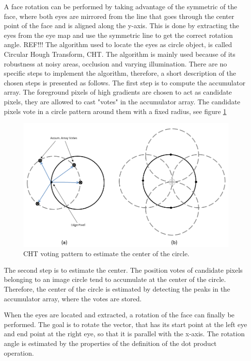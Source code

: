 A face rotation can be performed by taking advantage of the symmetric of the face, where both eyes are mirrored from the line that goes through the center point of the face and is aligned along the y-axis. This is done by extracting the eyes from the eye map and use the symmetric line to get the correct rotation angle.
\newline
REF!!!
The algorithm used to locate the eyes as circle object, is called Circular Hough Transform, CHT. The algorithm is mainly used because of its robustness at noisy areas, occlusion and varying illumination. There are no specific steps to implement the algorithm, therefore, a short description of the chosen steps is presented as follows.
\newline
\newline
The first step is to compute the accumulator array. The foreground pixels of high gradients are chosen to act as candidate pixels, they are allowed to cast "votes" in the accumulator array. The candidate pixels vote in a circle pattern around them with a fixed radius, see figure \ref{fig:CHT}
\newline
\begin{figure}[H]
\centering

\includegraphics[scale=0.4]{img/fd/accarray.png}

\caption{CHT voting pattern to estimate the center of the circle.}
\label{fig:CHT}
\end{figure}
\indent 
The second step is to estimate the center. The position votes of candidate pixels belonging to an image circle tend to accumulate at the center of the circle. Therefore, the center of the circle is estimated by detecting the peaks in the accumulator array, where the votes are stored.

When the eyes are located and extracted, a rotation of the face can finally be performed.  The goal is to rotate the vector, that has its start point at the left eye and end point at the right eye, so that it is parallel with the x-axis. The rotation angle is estimated by the properties of the definition of the dot product operation.
